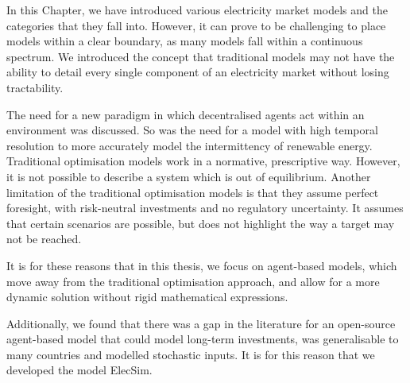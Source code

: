 In this Chapter, we have introduced various electricity market models and the categories that they fall into. However, it can prove to be challenging to place models within a clear boundary, as many models fall within a continuous spectrum. We introduced the concept that traditional models may not have the ability to detail every single component of an electricity market without losing tractability.

The need for a new paradigm in which decentralised agents act within an environment was discussed. So was the need for a model with high temporal resolution to more accurately model the intermittency of renewable energy. Traditional optimisation models work in a normative, prescriptive way. However, it is not possible to describe a system which is out of equilibrium. Another limitation of the traditional optimisation models is that they assume perfect foresight, with risk-neutral investments and no regulatory uncertainty. It assumes that certain scenarios are possible, but does not highlight the way a target may not be reached.

It is for these reasons that in this thesis, we focus on agent-based models, which move away from the traditional optimisation approach, and allow for a more dynamic solution without rigid mathematical expressions.

Additionally, we found that there was a gap in the literature for an open-source agent-based model that could model long-term investments, was generalisable to many countries and modelled stochastic inputs. It is for this reason that we developed the model ElecSim.





